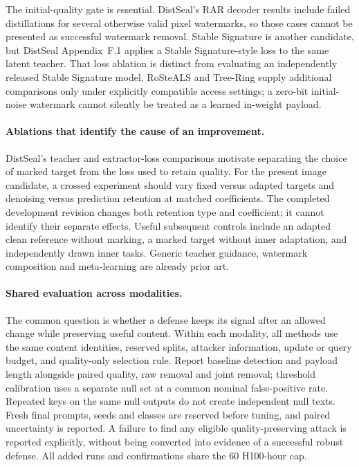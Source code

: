The initial-quality gate is essential. DistSeal's RAR decoder results include failed distillations for several otherwise valid pixel watermarks, so those cases cannot be presented as successful watermark removal. Stable Signature is another candidate, but DistSeal Appendix~F.1 applies a Stable Signature-style loss to the same latent teacher. That loss ablation is distinct from evaluating an independently released Stable Signature model. RoSteALS and Tree-Ring supply additional comparisons only under explicitly compatible access settings; a zero-bit initial-noise watermark cannot silently be treated as a learned in-weight payload.

\paragraph{Ablations that identify the cause of an improvement.} DistSeal's teacher and extractor-loss comparisons motivate separating the choice of marked target from the loss used to retain quality. For the present image candidate, a crossed experiment should vary fixed versus adapted targets and denoising versus prediction retention at matched coefficients. The completed development revision changes both retention type and coefficient; it cannot identify their separate effects. Useful subsequent controls include an adapted clean reference without marking, a marked target without inner adaptation, and independently drawn inner tasks. Generic teacher guidance, watermark composition and meta-learning are already prior art.

\paragraph{Shared evaluation across modalities.} The common question is whether a defense keeps its signal after an allowed change while preserving useful content. Within each modality, all methods use the same content identities, reserved splits, attacker information, update or query budget, and quality-only selection rule. Report baseline detection and payload length alongside paired quality, raw removal and joint removal; threshold calibration uses a separate null set at a common nominal false-positive rate. Repeated keys on the same null outputs do not create independent null texts. Fresh final prompts, seeds and classes are reserved before tuning, and paired uncertainty is reported. A failure to find any eligible quality-preserving attack is reported explicitly, without being converted into evidence of a successful robust defense. All added runs and confirmations share the 60 H100-hour cap.
